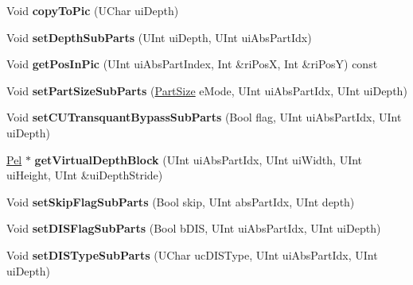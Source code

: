 \begin{DoxyCompactItemize}
Void {\bfseries copy\+To\+Pic} (U\+Char ui\+Depth)
\item 
\mbox{\label{class_t_com_data_c_u_a5859a0f51a5d4a3c5c8369c8de60278a}} 
Void {\bfseries set\+Depth\+Sub\+Parts} (U\+Int ui\+Depth, U\+Int ui\+Abs\+Part\+Idx)
\item 
\mbox{\label{class_t_com_data_c_u_aedb72291afbe009aa040308c6d4e2d9b}} 
Void {\bfseries get\+Pos\+In\+Pic} (U\+Int ui\+Abs\+Part\+Index, Int \&ri\+PosX, Int \&ri\+PosY) const
\item 
\mbox{\label{class_t_com_data_c_u_a8a547cee915ed801d325f386ed564ab6}} 
Void {\bfseries set\+Part\+Size\+Sub\+Parts} (\hyperlink{_type_def_8h_a0093b7809f3cfae06fda9d67441267bd}{Part\+Size} e\+Mode, U\+Int ui\+Abs\+Part\+Idx, U\+Int ui\+Depth)
\item 
\mbox{\label{class_t_com_data_c_u_a27e57c62b3c1a431c59108c3be3f7e33}} 
Void {\bfseries set\+C\+U\+Transquant\+Bypass\+Sub\+Parts} (Bool flag, U\+Int ui\+Abs\+Part\+Idx, U\+Int ui\+Depth)
\item 
\mbox{\label{class_t_com_data_c_u_a9b0c4a4d19b89b00c8caef97dd272038}} 
\hyperlink{_type_def_8h_af92141699657699b4b547be0c8517541}{Pel} $\ast$ {\bfseries get\+Virtual\+Depth\+Block} (U\+Int ui\+Abs\+Part\+Idx, U\+Int ui\+Width, U\+Int ui\+Height, U\+Int \&ui\+Depth\+Stride)
\item 
\mbox{\label{class_t_com_data_c_u_a4c3bd4b58362ef126e017e8b941fc211}} 
Void {\bfseries set\+Skip\+Flag\+Sub\+Parts} (Bool skip, U\+Int abs\+Part\+Idx, U\+Int depth)
\item 
\mbox{\label{class_t_com_data_c_u_af91eec70179853febdce34fb3c9d1c86}} 
Void {\bfseries set\+D\+I\+S\+Flag\+Sub\+Parts} (Bool b\+D\+IS, U\+Int ui\+Abs\+Part\+Idx, U\+Int ui\+Depth)
\item 
\mbox{\label{class_t_com_data_c_u_aa20700e8fd62bbdcb1cc99335f064b39}} 
Void {\bfseries set\+D\+I\+S\+Type\+Sub\+Parts} (U\+Char uc\+D\+I\+S\+Type, U\+Int ui\+Abs\+Part\+Idx, U\+Int ui\+Depth)
\item 
\mbox{\label{class_t_com_data_c_u_a8415fd3644d06e98d223913be2f8bd6b}} 

\end{DoxyCompactItemize}
